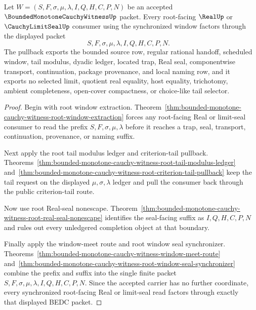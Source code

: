 \begin{theorem}
\label{thm:bounded-monotone-cauchy-witness-window-real-seal-pullback}
Let $W=(S,F,\sigma,\mu,\lambda,I,Q,H,C,P,N)$ be an accepted $\BoundedMonotoneCauchyWitnessUp$ packet. Every root-facing $\RealUp$ or $\CauchyLimitSealUp$ consumer using the synchronized window factors through the displayed packet
$$
S,F,\sigma,\mu,\lambda,I,Q,H,C,P,N.
$$
The pullback exports the bounded source row, regular rational handoff, scheduled window, tail modulus, dyadic ledger, located trap, Real seal, componentwise transport, continuation, package provenance, and local naming row, and it exports no selected limit, quotient real equality, host equality, trichotomy, ambient completeness, open-cover compactness, or choice-like tail selector.
\end{theorem}
\begin{proof}
Begin with root window extraction. Theorem~\ref{thm:bounded-monotone-cauchy-witness-root-window-extraction} forces any root-facing Real or limit-seal consumer to read the prefix $S,F,\sigma,\mu,\lambda$ before it reaches a trap, seal, transport, continuation, provenance, or naming suffix.

Next apply the root tail modulus ledger and criterion-tail pullback. Theorems~\ref{thm:bounded-monotone-cauchy-witness-root-tail-modulus-ledger} and~\ref{thm:bounded-monotone-cauchy-witness-root-criterion-tail-pullback} keep the tail request on the displayed $\mu,\sigma,\lambda$ ledger and pull the consumer back through the public criterion-tail route.

Now use root Real-seal nonescape. Theorem~\ref{thm:bounded-monotone-cauchy-witness-root-real-seal-nonescape} identifies the seal-facing suffix as $I,Q,H,C,P,N$ and rules out every unledgered completion object at that boundary.

Finally apply the window-meet route and root window seal synchronizer. Theorems~\ref{thm:bounded-monotone-cauchy-witness-window-meet-route} and~\ref{thm:bounded-monotone-cauchy-witness-root-window-seal-synchronizer} combine the prefix and suffix into the single finite packet $S,F,\sigma,\mu,\lambda,I,Q,H,C,P,N$. Since the accepted carrier has no further coordinate, every synchronized root-facing Real or limit-seal read factors through exactly that displayed BEDC packet.
\end{proof}

